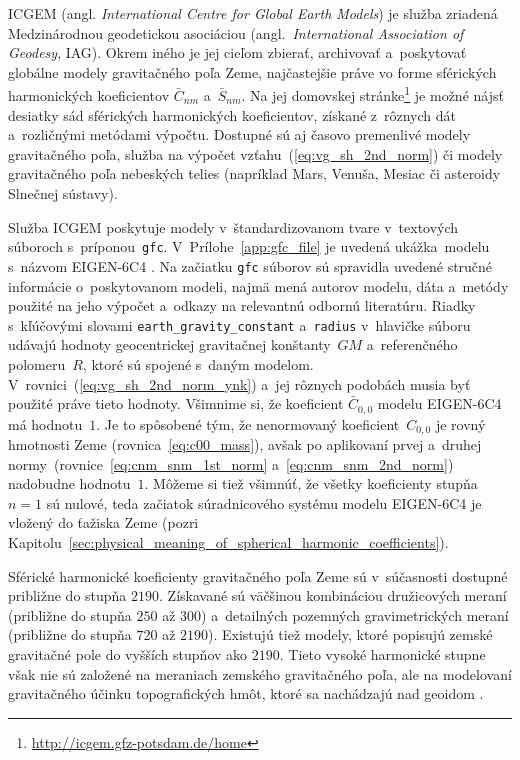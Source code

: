 \documentclass[a4paper,12pt]{book}
\begin{document}
ICGEM (angl. \emph{International Centre for Global Earth Models}) je služba 
zriadená Medzinárodnou geodetickou asociáciou (angl.~\emph{International 
Association of Geodesy}, IAG).  Okrem iného je jej cieľom zbierať, archivovať 
a~poskytovať globálne modely gravitačného poľa Zeme, najčastejšie práve vo 
forme sférických harmonických koeficientov $\bar{C}_{nm}$ a~$\bar{S}_{nm}$.  Na 
jej domovskej stránke\footnote{\url{http://icgem.gfz-potsdam.de/home}} je možné 
nájsť desiatky sád sférických harmonických koeficientov, získané z~rôznych dát 
a~rozličnými metódami výpočtu.  Dostupné sú aj časovo premenlivé modely 
gravitačného poľa, služba na výpočet vzťahu~(\ref{eq:vg_sh_2nd_norm}) či modely 
gravitačného poľa nebeských telies (napríklad Mars, Venuša, Mesiac či asteroidy 
Slnečnej sústavy).

Služba ICGEM poskytuje modely v~štandardizovanom tvare v~textových súboroch 
s~príponou~\texttt{gfc}.  V~Prílohe~\ref{app:gfc_file} je uvedená ukážka~modelu 
s~názvom EIGEN-6C4 \parencite{EIGEN-6C4}.  Na začiatku \texttt{gfc} súborov sú 
spravidla uvedené stručné informácie o~poskytovanom modeli, najmä mená autorov 
modelu, dáta a~metódy použité na jeho výpočet a~odkazy na relevantnú odbornú 
literatúru.  Riadky s~kľúčovými slovami \texttt{earth\_gravity\_constant} 
a~\texttt{radius} v~hlavičke súboru udávajú hodnoty geocentrickej gravitačnej 
konštanty~$GM$ a~referenčného polomeru~$R$, ktoré sú spojené s~daným modelom.  
V~rovnici~(\ref{eq:vg_sh_2nd_norm_ynk}) a~jej rôznych podobách musia byť 
použité práve tieto hodnoty.  Všimnime si, že koeficient $\bar{C}_{0,0}$ modelu 
EIGEN-6C4 má hodnotu~$1$.  Je to spôsobené tým, že nenormovaný 
koeficient~$C_{0,0}$ je rovný hmotnosti Zeme (rovnica~\ref{eq:c00_mass}), avšak 
po aplikovaní prvej a~druhej normy~(rovnice~\ref{eq:cnm_snm_1st_norm} 
a~\ref{eq:cnm_snm_2nd_norm}) nadobudne hodnotu~$1$.  Môžeme si tiež všimnúť, že 
všetky koeficienty stupňa~$n = 1$ sú nulové, teda začiatok súradnicového 
systému modelu EIGEN-6C4 je vložený do ťažiska Zeme (pozri 
Kapitolu~\ref{sec:physical_meaning_of_spherical_harmonic_coefficients}).

Sférické harmonické koeficienty gravitačného poľa Zeme sú v~súčasnosti dostupné
približne do stupňa $2190$.  Získavané sú väčšinou kombináciou družicových
meraní (približne do stupňa $250$ až $300$) a~detailných pozemných
gravimetrických meraní (približne do stupňa $720$ až $2190$).  Existujú tiež 
modely, ktoré popisujú zemské gravitačné pole do vyšších stupňov ako $2190$.  
Tieto vysoké harmonické stupne však nie sú založené na meraniach zemského 
gravitačného poľa, ale na modelovaní gravitačného účinku topografických hmôt, 
ktoré sa nachádzajú nad geoidom \parencite[napríklad][]{Ince2020}.
\end{document}
